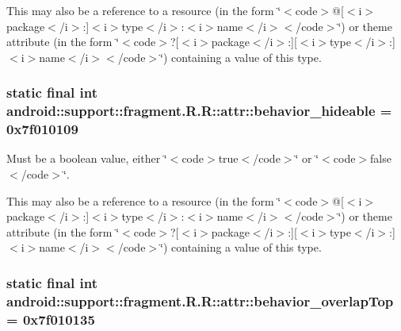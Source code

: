 This may also be a reference to a resource (in the form \char`\"{}$<$code$>$@\mbox{[}$<$i$>$package$<$/i$>$:\mbox{]}$<$i$>$type$<$/i$>$:$<$i$>$name$<$/i$>$$<$/code$>$\char`\"{}) or theme attribute (in the form \char`\"{}$<$code$>$?\mbox{[}$<$i$>$package$<$/i$>$:\mbox{]}\mbox{[}$<$i$>$type$<$/i$>$:\mbox{]}$<$i$>$name$<$/i$>$$<$/code$>$\char`\"{}) containing a value of this type. \hypertarget{classandroid_1_1support_1_1fragment_1_1_r_1_1attr_de74b57c829156fa8809d437523bc1aa}{
\subsubsection[{behavior\_\-hideable}]{\setlength{\rightskip}{0pt plus 5cm}static final int android::support::fragment.R.R::attr::behavior\_\-hideable = 0x7f010109}}
\label{classandroid_1_1support_1_1fragment_1_1_r_1_1attr_de74b57c829156fa8809d437523bc1aa}


Must be a boolean value, either \char`\"{}$<$code$>$true$<$/code$>$\char`\"{} or \char`\"{}$<$code$>$false$<$/code$>$\char`\"{}. 

This may also be a reference to a resource (in the form \char`\"{}$<$code$>$@\mbox{[}$<$i$>$package$<$/i$>$:\mbox{]}$<$i$>$type$<$/i$>$:$<$i$>$name$<$/i$>$$<$/code$>$\char`\"{}) or theme attribute (in the form \char`\"{}$<$code$>$?\mbox{[}$<$i$>$package$<$/i$>$:\mbox{]}\mbox{[}$<$i$>$type$<$/i$>$:\mbox{]}$<$i$>$name$<$/i$>$$<$/code$>$\char`\"{}) containing a value of this type. \hypertarget{classandroid_1_1support_1_1fragment_1_1_r_1_1attr_9588edc6516f4b533bd60a7a37e9d7c0}{
\subsubsection[{behavior\_\-overlapTop}]{\setlength{\rightskip}{0pt plus 5cm}static final int android::support::fragment.R.R::attr::behavior\_\-overlapTop = 0x7f010135}}
\label{classandroid_1_1support_1_1fragment_1_1_r_1_1attr_9588edc6516f4b533bd60a7a37e9d7c0}


